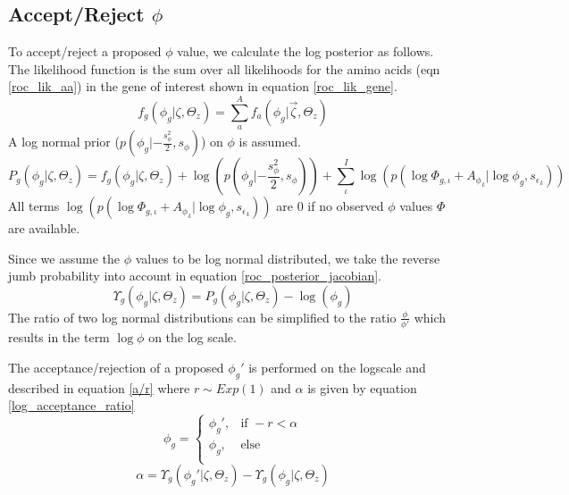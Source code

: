 \documentclass[11pt]{article}
\begin{document}
  \subsection{Accept/Reject $\phi$}
  To accept/reject a proposed $\phi$ value, we calculate the log posterior as follows.
  The likelihood function is the sum over all likelihoods for the amino acids (eqn \ref{roc_lik_aa}) in the gene of interest shown in equation \ref{roc_lik_gene}.
  \begin{equation}
    f_g(\phi_g|\zeta, \Theta_z) = \sum_a^A f_a(\phi_g|\vec{\zeta}, \Theta_z)
    \label{roc_lik_gene}
  \end{equation}
  A log normal prior ($p(\phi_g|-\frac{s_{\phi}^2}{2}, s_{\phi})$) on $\phi$ is assumed.
  \begin{equation}
    P_g(\phi_g|\zeta, \Theta_z) = f_g(\phi_g|\zeta, \Theta_z) + \log(p(\phi_g|-\frac{s_{\phi}^2}{2}, s_{\phi})) + \sum_{\iota}^I \log(p(\log{\Phi_{g,\iota}} + {A_{\phi}}_{\iota}| \log{\phi_g}, {s_{\epsilon}}_{\iota}))
    \label{roc_posterior}
  \end{equation}
  All terms $\log(p(\log{\Phi_{g,\iota}} + {A_{\phi}}_{\iota}| \log{\phi_g}, {s_{\epsilon}}_{\iota}))$ are $0$ if no observed $\phi$ values $\Phi$ are available. 
  
  Since we assume the $\phi$ values to be log normal distributed, we take the reverse jumb probability into account in equation \ref{roc_posterior_jacobian}.
  \begin{equation}
    \Upsilon_g(\phi_g|\zeta, \Theta_z) = P_g(\phi_g|\zeta, \Theta_z) - \log(\phi_g)
    \label{roc_posterior_jacobian}
  \end{equation}
  The ratio of two log normal distributions can be simplified to the ratio $\frac{\phi}{\phi'}$ which results in the term $\log{\phi}$ on the log scale.
  
  The acceptance/rejection of a proposed $\phi_g'$ is performed on the logscale and described in equation \ref{a/r} where $r \sim Exp(1)$ and $\alpha$ is given by equation \ref{log_acceptance_ratio}
  \begin{equation}
    \phi_g = 
    \begin{cases}
      \phi_g',	& \text{if } -r < \alpha \\
      \phi_g,	& \text{else } \\
    \end{cases}
     \label{a/r}
  \end{equation}  
  \begin{equation}
    \alpha = \Upsilon_g(\phi_g'|\zeta, \Theta_z) - \Upsilon_g(\phi_g|\zeta, \Theta_z)
    \label{log_acceptance_ratio}
  \end{equation}
  
\end{document}
